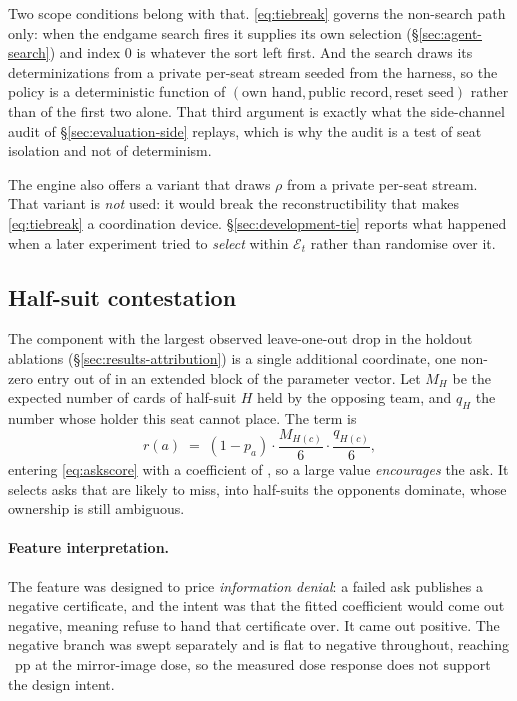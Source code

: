 Two scope conditions belong with that. \eqref{eq:tiebreak} governs the non-search path only: when
the endgame search fires it supplies its own selection (\S\ref{sec:agent-search}) and index $0$ is
whatever the sort left first. And the search draws its determinizations from a private per-seat
stream seeded from the harness, so the policy is a deterministic function of
$(\text{own hand}, \text{public record}, \text{reset seed})$ rather than of the first two alone. That
third argument is exactly what the side-channel audit of \S\ref{sec:evaluation-side} replays, which
is why the audit is a test of seat isolation and not of determinism.

The engine also offers a variant that draws $\rho$ from a private per-seat stream. That variant is
\emph{not} used: it would break the reconstructibility that makes \eqref{eq:tiebreak} a coordination
device. \S\ref{sec:development-tie} reports what happened when a later experiment tried to
\emph{select} within $\mathcal{E}_t$ rather than randomise over it.

\subsection{Half-suit contestation}
\label{sec:agent-contest}

The component with the largest observed leave-one-out drop in the holdout ablations
(\S\ref{sec:results-attribution}) is a single additional coordinate, one non-zero entry out of
\vsevenResponderTotal{} in an extended block of the parameter vector. Let $M_H$ be the expected number of cards of half-suit $H$ held by the
opposing team, and $q_H$ the number whose holder this seat cannot place. The term is
\begin{equation}
  r(a) \;=\; (1 - p_a)\cdot\frac{M_{H(c)}}{6}\cdot\frac{q_{H(c)}}{6},
  \label{eq:contest}
\end{equation}
entering \eqref{eq:askscore} with a \vsevenContestSign{} coefficient of
\texttt{\vsevenContestWeight{}}, so a large value \emph{encourages} the ask. It selects asks that are
likely to miss, into half-suits the opponents dominate, whose ownership is still ambiguous.

\paragraph{Feature interpretation.} The feature was designed to price \emph{information denial}: a
failed ask publishes a negative certificate, and the intent was that the fitted coefficient would
come out negative, meaning refuse to hand that certificate over. It came out positive. The negative
branch was swept separately and is flat to negative throughout, reaching \vsevenContestNegDose{}~pp
at the mirror-image dose, so the measured dose response does not support the design intent.

